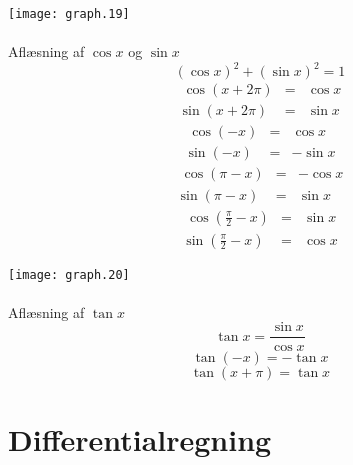 \documentclass[11pt,a5paper,fleqn,leqno]{book}
\begin{document}
\texttt{[image: graph.19]}
\\
\\
Aflæsning af $\cos x$ og $\sin x$
\begin{equation}
(\cos x)^2 + (\sin x)^2 = 1
\end{equation}
\begin{eqnarray}
\; \cos(x + 2\pi) & = & \cos x \\
\sin(x + 2\pi) & = & \sin x \nonumber
\end{eqnarray}
\begin{eqnarray}
\; \cos(-x) & = & \cos x \\
\sin(-x) & = & - \sin x \nonumber
\end{eqnarray}
\begin{eqnarray}
\; \cos(\pi - x) & = & - \cos x \\
\sin(\pi - x) & = & \sin x \nonumber
\end{eqnarray}
\begin{eqnarray}
\; \cos\left(\frac{\pi}{2}-x\right) & = & \sin x \\
\sin\left(\frac{\pi}{2}-x\right) & = & \cos x \nonumber
\end{eqnarray}

\texttt{[image: graph.20]}
\\
\\
Aflæsning af $\tan x$
\begin{equation}
\tan x = \frac{\sin x}{\cos x}
\end{equation}
\begin{equation}
\tan(-x) = -\tan x
\end{equation}
\begin{equation}
\tan(x+\pi) = \tan x
\end{equation}

\newpage

\section{Differentialregning}
\end{document}
